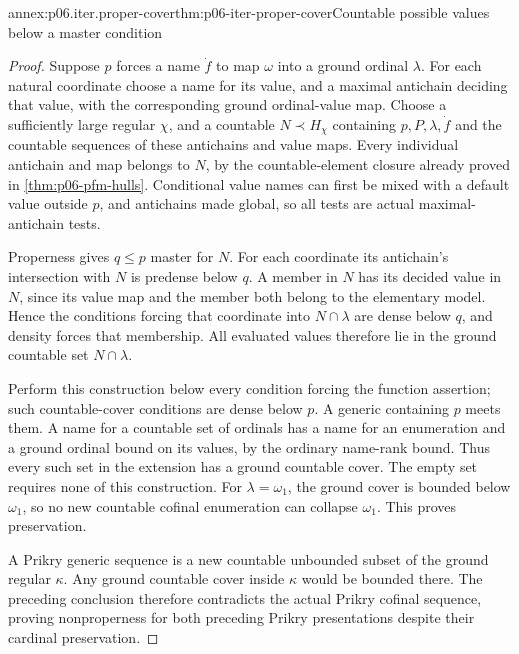 \begin{annexitem}{annex:p06.iter.proper-cover}{thm:p06-iter-proper-cover}{Countable possible values below a master condition}
\begin{proof}
Suppose \(p\) forces a name \(\dot f\) to map \(\omega\) into a
ground ordinal \(\lambda\). For each natural coordinate choose a
name for its value, and a maximal antichain deciding that value, with
the corresponding ground ordinal-value map. Choose a sufficiently
large regular \(\chi\), and a countable \(N\prec H_\chi\) containing
\(p,P,\lambda,\dot f\) and the countable sequences of these antichains
and value maps. Every individual antichain and map belongs to \(N\),
by the countable-element closure already proved in
\cref{thm:p06-pfm-hulls}. Conditional value names can first be mixed
with a default value outside \(p\), and antichains made global, so all
tests are actual maximal-antichain tests.

Properness gives \(q\leq p\) master for \(N\). For each coordinate
its antichain's intersection with \(N\) is predense below \(q\).
A member in \(N\) has its decided value in \(N\), since its value
map and the member both belong to the elementary model. Hence the
conditions forcing that coordinate into \(N\cap\lambda\) are dense
below \(q\), and density forces that membership. All evaluated values
therefore lie in the ground countable set \(N\cap\lambda\).

Perform this construction below every condition forcing the function
assertion; such countable-cover conditions are dense below \(p\).
A generic containing \(p\) meets them. A name for a countable set of
ordinals has a name for an enumeration and a ground ordinal bound on
its values, by the ordinary name-rank bound. Thus every such set in the
extension has a ground countable cover. The empty set requires none
of this construction. For \(\lambda=\omega_1\), the ground cover is
bounded below \(\omega_1\), so no new countable cofinal enumeration
can collapse \(\omega_1\). This proves preservation.

A Prikry generic sequence is a new countable unbounded subset of the
ground regular \(\kappa\). Any ground countable cover inside
\(\kappa\) would be bounded there. The preceding conclusion therefore
contradicts the actual Prikry cofinal sequence, proving nonproperness
for both preceding Prikry presentations despite their cardinal preservation.
\end{proof}
\end{annexitem}

